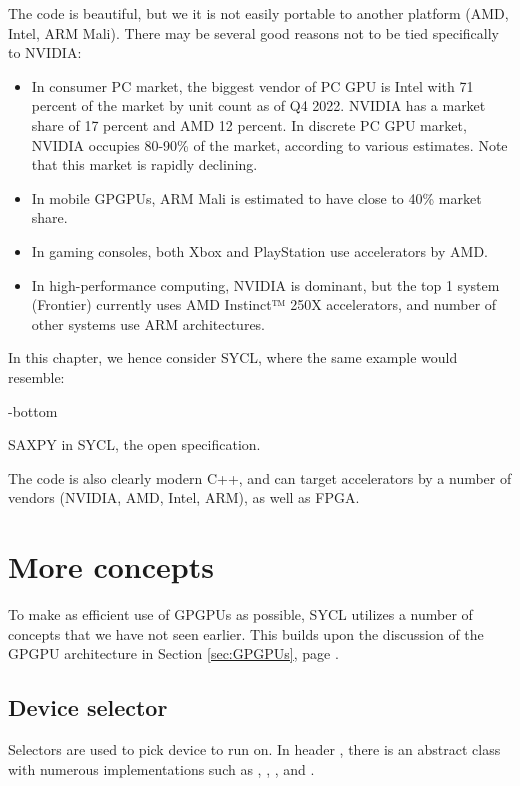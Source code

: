 The code is beautiful, but we it is not easily portable to another platform (AMD, Intel, ARM Mali). There may be several good reasons not to be tied specifically to NVIDIA:
\begin{itemize}
\item In consumer PC market, the biggest vendor of PC GPU is Intel with 71 percent of the market by unit count as of Q4 2022. NVIDIA has a market share of 17 percent and AMD 12 percent. In discrete PC GPU market, NVIDIA occupies 80-90\% of the market, according to various estimates. 
Note that this market is rapidly declining.
\item In mobile GPGPUs, ARM Mali is estimated to have close to 40\% market share.  
\item In gaming consoles, both Xbox and PlayStation use accelerators by AMD. 
\item In high-performance computing, NVIDIA is dominant, but the top 1 system (Frontier) currently uses AMD Instinct™ 250X accelerators, and number of other systems use ARM architectures. 
\end{itemize}

In this chapter, we hence consider SYCL, where the same example would resemble:

\ragged-bottom
\begin{codebox}[]{}
\footnotesize SAXPY in SYCL, the open specification.
\tcblower
{}
\end{codebox}

The code is also clearly modern C++, and can target accelerators by a number of vendors (NVIDIA, AMD, Intel, ARM), as well as FPGA.

\section{More concepts}

To make as efficient use of GPGPUs as possible, SYCL utilizes a number of concepts that 
we have not seen earlier. This builds upon the discussion of the GPGPU architecture in Section \ref{sec:GPGPUs}, page \pageref{sec:GPGPUs}.

\subsection{Device selector}

Selectors are used to pick device to run on.
In header , there is an abstract class  with numerous implementations
such as , , , and .

